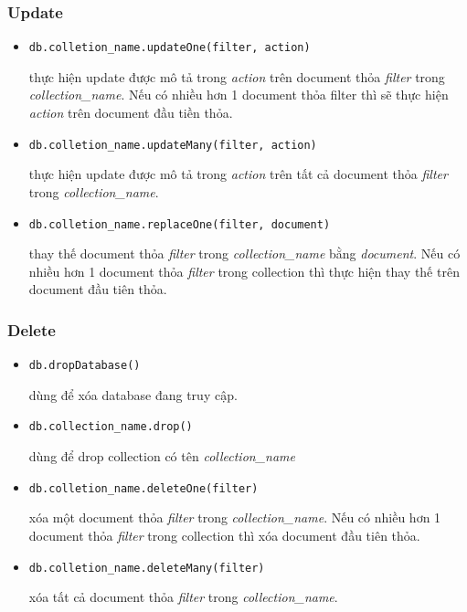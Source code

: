 \subsubsection{Update}
\begin{itemize}
\item
\begin{lstlisting}
db.colletion_name.updateOne(filter, action)
\end{lstlisting}
thực hiện update được mô tả trong \textit{action} trên document thỏa \textit{filter} trong \textit{collection\_name}. Nếu có nhiều hơn 1 document thỏa filter thì sẽ thực hiện \textit{action} trên document đầu tiền thỏa.
\item
\begin{lstlisting}
db.colletion_name.updateMany(filter, action)
\end{lstlisting}
thực hiện update được mô tả trong \textit{action} trên tất cả document thỏa \textit{filter} trong \textit{collection\_name}.
\item
\begin{lstlisting}
db.colletion_name.replaceOne(filter, document)
\end{lstlisting}
thay thế document thỏa \textit{filter} trong \textit{collection\_name} bằng \textit{document}. Nếu có nhiều hơn 1 document thỏa \textit{filter} trong collection thì thực hiện thay thế trên document đầu tiên thỏa.
\end{itemize}
\subsubsection{Delete}
\begin{itemize}
\item
\begin{lstlisting}
db.dropDatabase()
\end{lstlisting}
dùng để xóa database đang truy cập.
\item
\begin{lstlisting}
db.collection_name.drop()
\end{lstlisting}
dùng để drop collection có tên \textit{collection\_name}
\item
\begin{lstlisting}
db.colletion_name.deleteOne(filter)
\end{lstlisting}
xóa một document thỏa \textit{filter} trong \textit{collection\_name}. Nếu có nhiều hơn 1 document thỏa \textit{filter} trong collection thì xóa document đầu tiên thỏa.
\item
\begin{lstlisting}
db.colletion_name.deleteMany(filter)
\end{lstlisting}
xóa tất cả document thỏa \textit{filter} trong \textit{collection\_name}.
\end{itemize}
